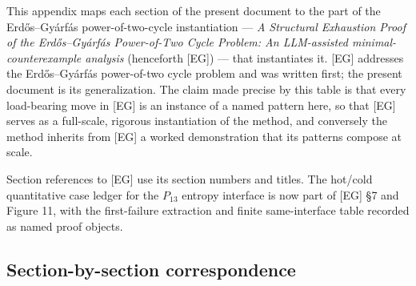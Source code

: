 \documentclass[
  11pt,
]{article}
\theoremstyle{definition}
\begin{document}
This appendix maps each section of the present document to the part of
the Erdős--Gyárfás power-of-two-cycle instantiation --- \emph{A
Structural Exhaustion Proof of the Erdős--Gyárfás Power-of-Two Cycle
Problem: An LLM-assisted minimal-counterexample analysis} (henceforth
{[}EG{]}) --- that instantiates it. {[}EG{]} addresses the
Erdős--Gyárfás power-of-two cycle problem and was written first; the
present document is its generalization. The claim made precise by this
table is that every load-bearing move in {[}EG{]} is an instance of a
named pattern here, so that {[}EG{]} serves as a full-scale, rigorous
instantiation of the method, and conversely the method inherits from
{[}EG{]} a worked demonstration that its patterns compose at scale.

Section references to {[}EG{]} use its section numbers and titles. The
hot/cold quantitative case ledger for the \(P_{13}\) entropy interface
is now part of {[}EG{]} §7 and Figure 11, with the first-failure
extraction and finite same-interface table recorded as named proof
objects.

\subsection{Section-by-section
correspondence}\label{b.1-section-by-section-correspondence}
\end{document}
